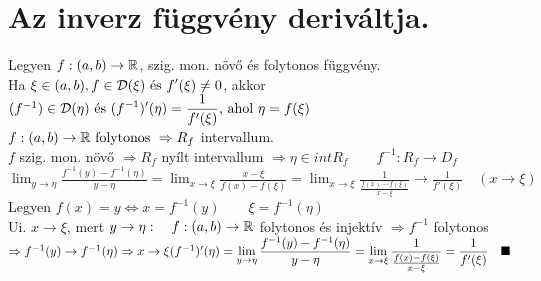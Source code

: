 \documentclass[a4paper,11pt]{article}
\begin{document}
\section{Az inverz függvény deriváltja.}
\tetel Legyen $f:(a,b)\to\mathbb{R}$, szig. mon. növő és folytonos függvény.\\[0.1cm]Ha 
$\xi\in(a,b),f\in\displaystyle\mathcal{D}(\xi) \text{ és }f'(\xi)\neq0$, akkor\\[0.1cm] 
$(f^{-1})\in\displaystyle\mathcal{D}(\eta)\text{ és }(f^{-1})'(\eta)=\frac{1}{f'(\xi)}
\text{, ahol }\eta=f(\xi)$\\[0.2cm]\biz $f:(a,b)\to\mathbb{R}\text{ folytonos }
\Rightarrow R_f$ intervallum.\\[0.2cm] $f$ szig. mon. növő $\Rightarrow R_f$ 
nyílt intervallum $\Rightarrow\eta\in int R_f\quad\quad f^{-1}:R_f\to D_f$
\\[0.2cm] $\displaystyle\lim_{y\to\eta}\frac{f^{-1}(y)-f^{-1}(\eta)}{y-\eta}=
\displaystyle\lim_{x\to\xi}\frac{x-\xi}{f(x)-f(\xi)}=\displaystyle\lim_{x\to\xi}
\frac{1}{\frac{f(x)-f(\xi)}{x-\xi}}\longrightarrow\frac{1}{f'(\xi)}\quad
(x\to\xi)$\\[0.2cm] Legyen $f(x)=y\Leftrightarrow x=f^{-1}(y)\quad
\quad\xi=f^{-1}(\eta)$\\[0.2cm] Ui. $x\to\xi$, mert $y\to\eta:\quad 
f:(a,b)\to\mathbb{R}$ folytonos és injektív $\Rightarrow f^{-1}$ folytonos $\Rightarrow 
f^{-1}(y)\to f^{-1}(\eta)\\[0.1cm]\Rightarrow x\to\xi\\[0.2cm](f^{-1})'(\eta)
=\displaystyle\lim_{y\to\eta}\frac{f^{-1}(y)-f^{-1}(\eta)}{y-\eta}=\lim
\limits_{x\to\xi}\frac{1}{\frac{f(x)-f(\xi)}{x-\xi}}= \frac{1}{f'(\xi)}\quad\blacksquare$
\end{document}
